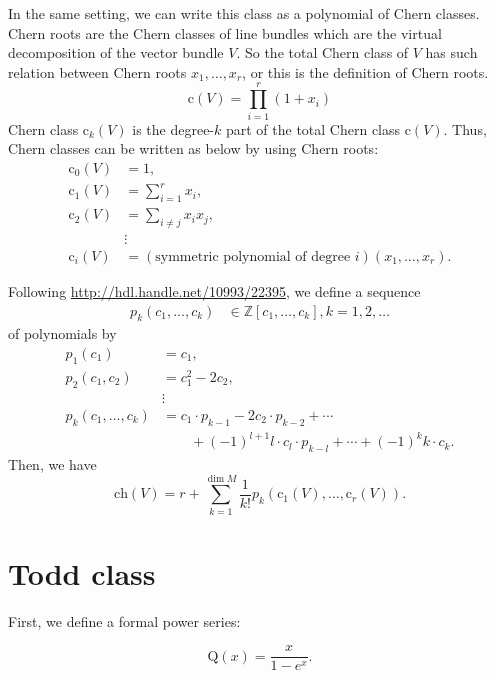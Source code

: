 \documentclass[uplatex,dvipdfmx]{jsarticle}
\begin{document}
In the same setting, we can write this class as a polynomial of Chern classes.
Chern roots are the Chern classes of line bundles which are the virtual decomposition
of the vector bundle
$V$.
So the total Chern class of
$V$
has such relation between Chern roots
$x_1, \ldots, x_r$,
or this is the definition of Chern roots.
\begin{equation}
    \mathrm{c}(V) = \prod_{i=1}^r \left( 1 + x_i \right)
\end{equation}
Chern class
$\mathrm{c}_k(V)$
is the 
degree-$k$
part of the total Chern class
$\mathrm{c}(V)$.
Thus, Chern classes can be written as below by using Chern roots:
\begin{align}
    \mathrm{c}_0(V) &= 1,\\
    \mathrm{c}_1(V) &= \sum_{i=1}^{r} x_i,\\
    \mathrm{c}_2(V) &= \sum_{i \neq j} x_ix_j,\\
    &\vdots\\
    \mathrm{c}_i(V) &= (\text{symmetric polynomial of degree $i$})(x_1,\ldots,x_r).
\end{align}


Following \url{http://hdl.handle.net/10993/22395},
we define a sequence
\begin{align}
    p_k(c_1, \ldots, c_k) &\in \mathbb{Z}[c_1, \ldots, c_k],
    k = 1, 2, \ldots
\end{align}
of polynomials
by
\begin{align}
    p_1(c_1) &= c_1,\\
    p_2(c_1, c_2) &= c_1^2 - 2c_2,\\
    &\vdots\\
    p_k(c_1, \ldots, c_k) &= c_1 \cdot p_{k-1} - 2c_2 \cdot p_{k-2} + \cdots \\
        &\qquad + (-1)^{l+1}l \cdot c_l \cdot p_{k-l} + \cdots +
        (-1)^k k \cdot c_k.
\end{align}
Then, we have
\begin{equation}
    \mathrm{ch}(V)
    =
    r +
    \sum_{k=1}^{\operatorname{dim} M}
    \frac{1}{k!}
    p_k(\mathrm{c}_1(V), \ldots, \mathrm{c}_r(V)).
\end{equation}


\section{Todd class}

First, we define a formal power series:

\begin{equation}
    \mathrm{Q}(x)
    =
    \frac{x}{1 - e^x}.
\end{equation}
\end{document}
